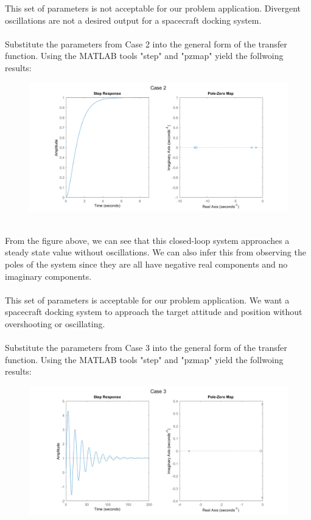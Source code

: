\documentclass[]{article}
\begin{document}
\begin{enumerate}
\begin{enumerate}
{        This set of parameters is not acceptable for our problem application. Divergent oscillations are not a desired output for a spacecraft docking system.\\\\
        Substitute the parameters from Case 2 into the general form of the transfer function. Using the MATLAB tools "step" and "pzmap" yield the follwoing results:\\
        \begin{figure}[h]
            \includegraphics[scale=0.45,center]{AERO_422_HW3_P1case2.png}
        \end{figure}\\
        From the figure above, we can see that this closed-loop system approaches a steady state value without oscillations. We can also infer this from observing the poles of the system since they are all have negative real components and no imaginary components.\\\\
        This set of parameters is acceptable for our problem application. We want a spacecraft docking system to approach the target attitude and position without overshooting or oscillating.\\\\
        Substitute the parameters from Case 3 into the general form of the transfer function. Using the MATLAB tools "step" and "pzmap" yield the follwoing results:\\
        \begin{figure}[h]
            \includegraphics[scale=0.45,center]{AERO_422_HW3_P1case3.png}

\end{figure}}
\end{enumerate}
\end{enumerate}
\end{document}
